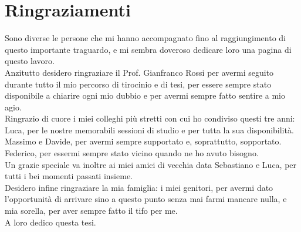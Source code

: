 
\section{Ringraziamenti}

Sono diverse le persone che mi hanno accompagnato fino al raggiungimento di questo importante traguardo, e mi sembra doveroso dedicare loro una pagina di questo lavoro.\\

Anzitutto desidero ringraziare il Prof. Gianfranco Rossi per avermi seguito durante tutto il mio percorso di tirocinio e di tesi, per essere sempre stato disponibile a chiarire ogni mio dubbio e per avermi sempre fatto sentire a mio agio.\\

Ringrazio di cuore i miei colleghi più stretti con cui ho condiviso questi tre anni:\\
Luca, per le nostre memorabili sessioni di studio e per tutta la sua disponibilità.\\
Massimo e Davide, per avermi sempre supportato e, soprattutto, sopportato.\\
Federico, per essermi sempre stato vicino quando ne ho avuto bisogno.\\
Un grazie speciale va inoltre ai miei amici di vecchia data Sebastiano e Luca, per tutti i bei momenti passati insieme.\\

Desidero infine ringraziare la mia famiglia: i miei genitori, per avermi dato l'opportunità di arrivare sino a questo punto senza mai farmi mancare nulla, e mia sorella, per aver sempre fatto il tifo per me.\\
A loro dedico questa tesi.\\

\newpage
\thispagestyle{empty}
\mbox{}



